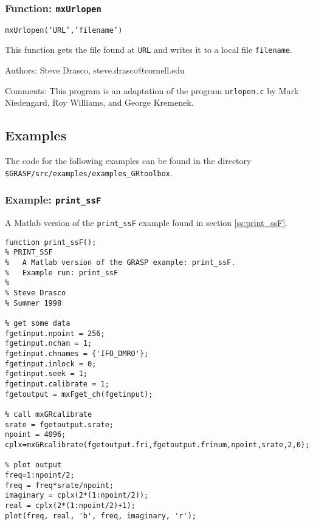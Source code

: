 \subsubsection{Function: {\tt mxUrlopen}}
\label{sss:mxUrlopen}

\texttt{mxUrlopen('URL','filename')}

This function gets the file found at \texttt{URL} and writes it to a local
file \texttt{filename}.

\begin{description}
\item{Authors:} Steve Drasco, steve.drasco@cornell.edu
\item{Comments:}
This program is an adaptation of the program \texttt{urlopen.c} by 
Mark Niedengard, Roy Williams, and George Kremenek.
\end{description}

\subsection{Examples}
\label{ss:GRtoolboxExamples}

The code for the following examples can be found in the directory \\
\texttt{\$GRASP/src/examples/examples\_GRtoolbox}.

\subsubsection{Example: {\tt print\_ssF}}
\label{sss:print_ssF}

A Matlab version of the \texttt{print\_ssF} example found in section \ref{ss:print_ssF}.

\begin{verbatim}
function print_ssF();
% PRINT_SSF
%	A Matlab version of the GRASP example: print_ssF.
%	Example run: print_ssF
%
% Steve Drasco
% Summer 1998

% get some data
fgetinput.npoint = 256;
fgetinput.nchan = 1;
fgetinput.chnames = {'IFO_DMRO'};
fgetinput.inlock = 0;
fgetinput.seek = 1;
fgetinput.calibrate = 1;
fgetoutput = mxFget_ch(fgetinput);

% call mxGRcalibrate
srate = fgetoutput.srate;
npoint = 4096;
cplx=mxGRcalibrate(fgetoutput.fri,fgetoutput.frinum,npoint,srate,2,0);

% plot output
freq=1:npoint/2;
freq = freq*srate/npoint;
imaginary = cplx(2*(1:npoint/2));
real = cplx(2*(1:npoint/2)+1);
plot(freq, real, 'b', freq, imaginary, 'r');
\end{verbatim}

